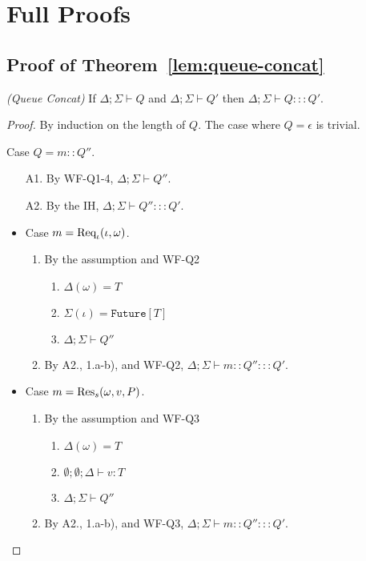\section{Full Proofs}

\subsection{Proof of Theorem~\ref{lem:queue-concat}}\label{app:queue-concat}

\begin{thm}
\emph{(Queue Concat)}
If $\Delta ; \Sigma \vdash Q$ and $\Delta ; \Sigma \vdash Q'$ then $\Delta ; \Sigma \vdash Q ::: Q'$.
\end{thm}
\begin{proof}
By induction on the length of $Q$. The case where $Q = \epsilon$ is trivial.

Case $Q = m :: Q''$.
\begin{enumerate}
\item[A1.] By WF-Q1-4, $\Delta ; \Sigma \vdash Q''$.
\item[A2.] By the IH, $\Delta ; \Sigma \vdash Q'' ::: Q'$.
\end{enumerate}

\begin{itemize}
\item Case $m = {\textrm{Req}_{\iota}(\iota, \omega)}$.
\begin{enumerate}
\item By the assumption and WF-Q2
  \begin{enumerate}[label=(\alph*)]
  \item $\Delta(\omega) = T$
  \item $\Sigma(\iota) = \texttt{Future}[T]$
  \item $\Delta ; \Sigma \vdash Q''$
  \end{enumerate}
\item By A2., 1.a-b), and WF-Q2, $\Delta ; \Sigma \vdash m :: Q'' ::: Q'$.
\end{enumerate}

\item Case $m = {\textrm{Res}_s(\omega, v, P)}$.
\begin{enumerate}
\item By the assumption and WF-Q3
  \begin{enumerate}[label=(\alph*)]
  \item $\Delta(\omega) = T$
  \item $\emptyset ; \emptyset ; \Delta \vdash v : T$
  \item $\Delta ; \Sigma \vdash Q''$
  \end{enumerate}
\item By A2., 1.a-b), and WF-Q3, $\Delta ; \Sigma \vdash m :: Q'' ::: Q'$.
\end{enumerate}


\end{itemize}
\end{proof}
